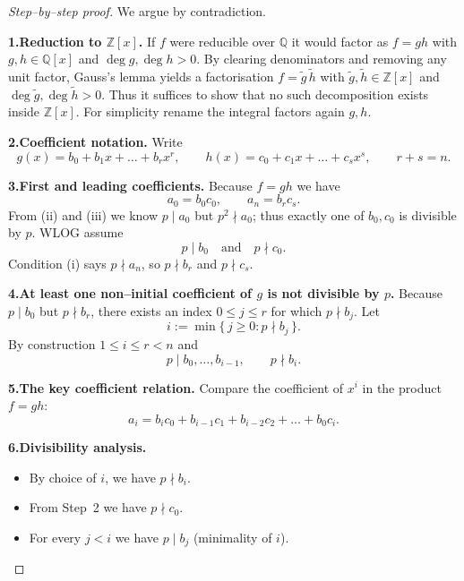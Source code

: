 \documentclass[12pt]{article}
\theoremstyle{definition} %
\theoremstyle{plain} %
\begin{document}
      \begin{proof}[Step--by--step proof]
      We argue by contradiction.
      
      \smallskip
      \textbf{1.\;Reduction to \(\mathbb{Z}[x]\).}  
      If \(f\) were reducible over \(\mathbb{Q}\) it would factor as  
      \(f=gh\) with \(g,h\in\mathbb{Q}[x]\) and \(\deg g,\deg h>0\).  
      By clearing denominators and removing any unit factor, Gauss’s lemma
      yields a factorisation \(f=\tilde g\,\tilde h\) with  
      \(\tilde g,\tilde h\in\mathbb{Z}[x]\) and  
      \(\deg\tilde g,\deg\tilde h>0\).  
      Thus it suffices to show that no such decomposition exists inside
      \(\mathbb{Z}[x]\).  
      For simplicity rename the integral factors again \(g,h\).
      
      \smallskip
      \textbf{2.\;Coefficient notation.}  
      Write  
      \[
         g(x)=b_{0}+b_{1}x+\dots+b_{r}x^{r},
         \qquad
         h(x)=c_{0}+c_{1}x+\dots+c_{s}x^{s},
         \qquad r+s=n .
      \]
      
      \smallskip
      \textbf{3.\;First and leading coefficients.}  
      Because \(f=gh\) we have
      \[
         a_{0}=b_{0}c_{0},
         \qquad
         a_{n}=b_{r}c_{s}.
      \]
      From (ii) and (iii) we know \(p\mid a_{0}\) but \(p^{2}\nmid a_{0}\);
      thus exactly one of \(b_{0},c_{0}\) is divisible by \(p\).
      WLOG assume
      \[
         p\mid b_{0}
         \quad\text{and}\quad
         p\nmid c_{0}.
      \]
      Condition (i) says \(p\nmid a_{n}\), so \(p\nmid b_{r}\) and \(p\nmid c_{s}\).
      
      \smallskip
      \textbf{4.\;At least one non--initial coefficient of \(g\) is not
      divisible by \(p\).}  
      Because \(p\mid b_{0}\) but \(p\nmid b_{r}\), there exists an index
      \(0\le j\le r\) for which \(p\nmid b_{j}\).
      Let
      \[
         i:=\min\{\,j\ge 0 : p\nmid b_{j}\,\}.
      \]
      By construction \(1\le i\le r < n\) and
      \[
         p\mid b_{0},\dots,b_{i-1},
         \qquad
         p\nmid b_{i}.
      \]
      
      \smallskip
      \textbf{5.\;The key coefficient relation.}  
      Compare the coefficient of \(x^{i}\) in the product \(f=gh\):
      \[
         a_{i}=b_{i}c_{0}+b_{i-1}c_{1}+b_{i-2}c_{2}+\dots+b_{0}c_{i}.
      \]
      
      \smallskip
      \textbf{6.\;Divisibility analysis.}  
      
      \begin{itemize}
      \item By choice of \(i\), we have \(p\nmid b_{i}\).
      \item From Step~2 we have \(p\nmid c_{0}\).
      \item For every \(j<i\) we have \(p\mid b_{j}\) (minimality of \(i\)).
      \end{itemize}
      

\end{proof}
\end{document}
